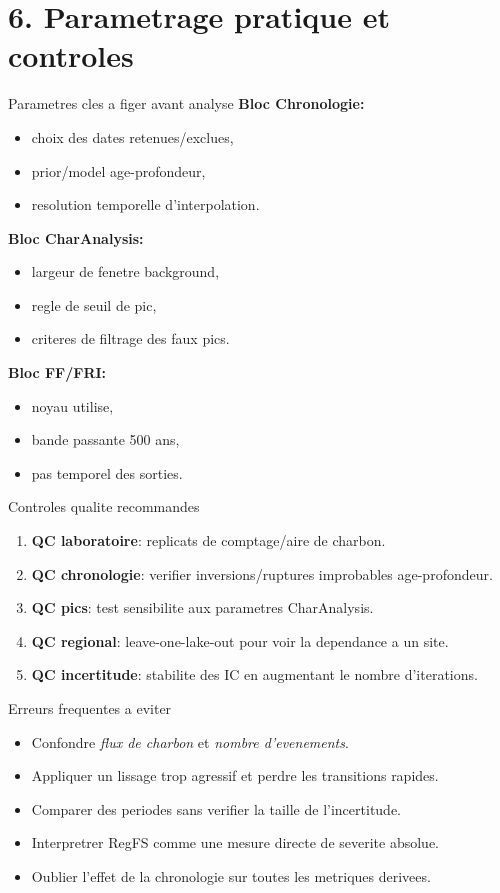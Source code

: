 \documentclass[aspectratio=169,11pt]{beamer}
\begin{document}
\section{6. Parametrage pratique et controles}

\begin{frame}{Parametres cles a figer avant analyse}
\textbf{Bloc Chronologie:}
\begin{itemize}
  \item choix des dates retenues/exclues,
  \item prior/model age-profondeur,
  \item resolution temporelle d'interpolation.
\end{itemize}

\textbf{Bloc CharAnalysis:}
\begin{itemize}
  \item largeur de fenetre background,
  \item regle de seuil de pic,
  \item criteres de filtrage des faux pics.
\end{itemize}

\textbf{Bloc FF/FRI:}
\begin{itemize}
  \item noyau utilise,
  \item bande passante 500 ans,
  \item pas temporel des sorties.
\end{itemize}
\end{frame}

\begin{frame}{Controles qualite recommandes}
\begin{enumerate}
  \item \textbf{QC laboratoire}: replicats de comptage/aire de charbon.
  \item \textbf{QC chronologie}: verifier inversions/ruptures improbables age-profondeur.
  \item \textbf{QC pics}: test sensibilite aux parametres CharAnalysis.
  \item \textbf{QC regional}: leave-one-lake-out pour voir la dependance a un site.
  \item \textbf{QC incertitude}: stabilite des IC en augmentant le nombre d'iterations.
\end{enumerate}
\end{frame}

\begin{frame}{Erreurs frequentes a eviter}
\begin{itemize}
  \item Confondre \textit{flux de charbon} et \textit{nombre d'evenements}.
  \item Appliquer un lissage trop agressif et perdre les transitions rapides.
  \item Comparer des periodes sans verifier la taille de l'incertitude.
  \item Interpretrer RegFS comme une mesure directe de severite absolue.
  \item Oublier l'effet de la chronologie sur toutes les metriques derivees.
\end{itemize}
\end{frame}
\end{document}
